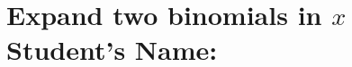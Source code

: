 \documentclass[12pt, a4paper, addpoints]{exam}
\newcommand{\randcoef}{%
    \pgfmathtruncatemacro{\temp}{random(1,5)}\temp
}
\newcommand{\perfectsquare}{%
    \pgfmathsetmacro{\a}{\randcoef} %
    \pgfmathsetmacro{\b}{\randcoef} %
    \((\a x + \b)(\a x + \b)\)
}
\newcommand{\differenceofsquares}{%
    \pgfmathsetmacro{\a}{\randcoef} %
    \pgfmathsetmacro{\b}{\randcoef} %
    \((\a x + \b)(\a x - \b)\)
}
\newcommand{\trivialform}{%
    \pgfmathsetmacro{\b}{\randcoef} %
    \((x + \b)(x + \b)\)
}
\newcommand{\generalform}{%
    \pgfmathsetmacro{\a}{\randcoef} %
    \pgfmathsetmacro{\b}{\randcoef} %
    \((\a x + \b)(\a x + \b)\)
}
\begin{document}
\section*{Expand two binomials in \( x \) \quad  Student's Name: \underline{\hspace{5cm}}}

\begin{questions}
\LARGE

\question
\setlength{\columnsep}{20pt}
\begin{multicols}{2}
\begin{parts}
    \part  \( \perfectsquare \)   \ps
    \part  \( \perfectsquare \)   \ps
\end{parts}
\end{multicols}

\question
\setlength{\columnsep}{20pt}
\begin{multicols}{2}
\begin{parts}
    \part  \( \differenceofsquares \)   \ps
    \part  \( \differenceofsquares \)   \ps
\end{parts}
\end{multicols}

\question
\setlength{\columnsep}{20pt}
\begin{multicols}{2}
\begin{parts}
    \part  \( \trivialform \)   \ps
    \part  \( \trivialform \)   \ps
\end{parts}
\end{multicols}

\question
\setlength{\columnsep}{20pt}
\begin{multicols}{2}
\begin{parts}
    \part  \( \generalform \)   \ps
    \part  \( \generalform \)   \ps
\end{parts}
\end{multicols}

\end{questions}
\end{document}
